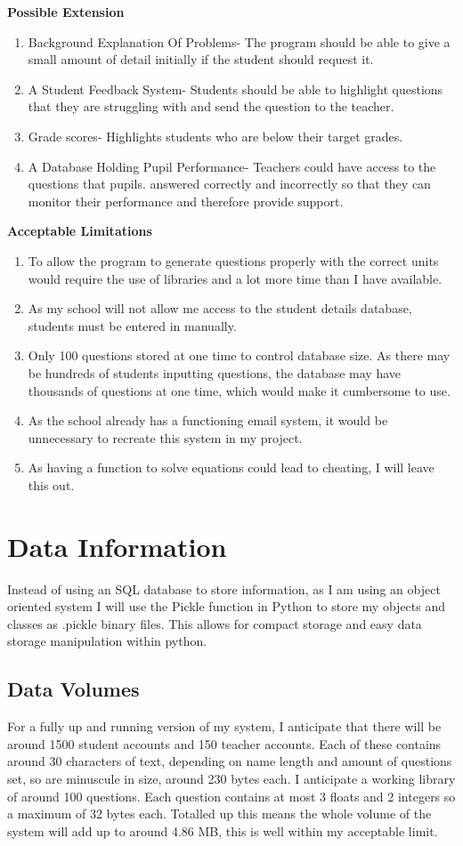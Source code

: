 \documentclass[a4paper,12pt]{report}
\begin{document}
\textbf{Possible Extension}
\begin{enumerate}
\item Background Explanation Of Problems- The program should be able to give a small amount of detail initially if the student should request it.
\item A Student Feedback System- Students should be able to highlight questions that they are struggling with and send the question to the teacher. 
\item Grade scores- Highlights students who are below their target grades.
\item A Database Holding Pupil Performance- Teachers could have access to the questions that pupils. answered correctly and incorrectly so that they can monitor their performance and therefore provide support.
\end{enumerate}
\textbf{Acceptable Limitations}\\
\begin{enumerate}
\item  To allow the program to generate questions properly with the correct units would require the use of libraries and a lot more time than I have available.
\item  As my school will not allow me access to the student details database, students must be entered in manually.
\item  Only 100 questions stored at one time to control database size. As there may be hundreds of students inputting questions, the database may have thousands of questions at one time, which would make it cumbersome to use.
\item As the school already has a functioning email system, it would be unnecessary to recreate this system in my project.
\item  As having a function to solve equations could lead to cheating, I will leave this out.
\end{enumerate}

\section{Data Information}
Instead of using an SQL database to store information, as I am using an object oriented system I will use the Pickle function in Python to store my objects and classes as .pickle binary files. This allows for compact storage and easy data storage manipulation within python.
\subsection{Data Volumes}
For a fully up and running version of my system, I anticipate that there will be around 1500 student accounts and 150 teacher accounts. Each of these contains around 30 characters of text, depending on name length and amount of questions set, so are minuscule in size, around 230 bytes each. I anticipate a working library of around 100 questions. Each question contains at most 3 floats and 2 integers so a maximum of 32 bytes each. Totalled up this means the whole volume of the system will add up to around 4.86 MB, this is well within my acceptable limit.
\end{document}
